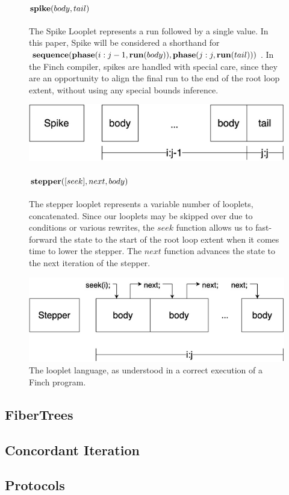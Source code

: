 \begin{figure}[ht]
\begin{minipage}[c]{0.6\linewidth}
        \paragraph{$\text{\textbf{spike}}(body, tail)$} The Spike Looplet represents a run
        followed by a single value. In this paper, Spike will be considered a
        shorthand for $\text{\textbf{sequence}}(\text{\textbf{phase}}(i:j-1, \text{\textbf{run}}(body)),
        \text{\textbf{phase}}(j:j, \text{\textbf{run}}(tail)))$.  In the Finch compiler, spikes are
        handled with special care, since they are an opportunity to align the
        final run to the end of the root loop extent, without using any special
        bounds inference.
    \end{minipage}%
    \begin{minipage}[c]{0.4\linewidth}
        \centering
        \includegraphics[scale=0.25]{Looplets-spike.png}
    \end{minipage}

    \begin{minipage}[c]{0.6\linewidth}
        \paragraph{$\text{\textbf{stepper}}([seek], next, body)$} The stepper looplet
        represents a variable number of looplets, concatenated. Since our
        looplets may be skipped over due to conditions or various rewrites, the
        $seek$ function allows us to fast-forward the state to the start of the
        root loop extent when it comes time to lower the stepper. The $next$
        function advances the state to the next iteration of the stepper. 
    \end{minipage}%
    \begin{minipage}[c]{0.4\linewidth}
        \centering
        \includegraphics[scale=0.25]{Looplets-stepper.png}
    \end{minipage}
    \caption{The looplet language, as understood in a correct execution of a Finch program.}
\end{figure}


\subsection{FiberTrees}

\subsection{Concordant Iteration}

\subsection{Protocols}